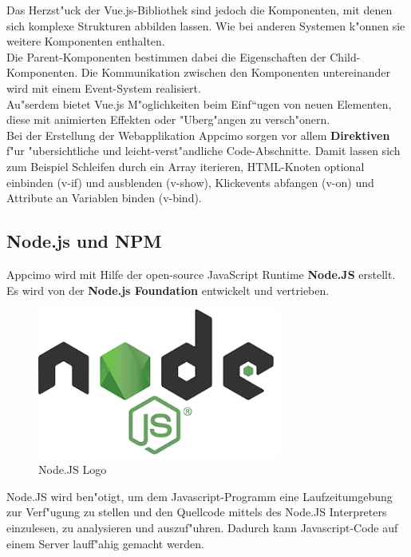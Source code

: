 \documentclass[a4paper, 11pt]{scrreprt}
\begin{document}
Das Herzst"uck der Vue.js-Bibliothek sind jedoch die Komponenten, mit denen sich komplexe Strukturen abbilden lassen. Wie bei anderen Systemen k"onnen sie weitere Komponenten enthalten.\\
Die Parent-Komponenten bestimmen dabei die Eigenschaften der Child-Komponenten. Die Kommunikation zwischen den Komponenten untereinander wird mit einem Event-System realisiert.\\

Au"serdem bietet Vue.js M"oglichkeiten beim Einf“ugen von neuen Elementen, diese mit animierten Effekten oder "Uberg"angen zu versch"onern.\\

Bei der Erstellung der Webapplikation Appcimo sorgen vor allem \textbf{Direktiven} f"ur "ubersichtliche und leicht-verst"andliche Code-Abschnitte. Damit lassen sich zum Beispiel Schleifen durch ein Array iterieren, HTML-Knoten optional einbinden (v-if) und ausblenden (v-show), Klickevents abfangen (v-on) und Attribute an Variablen binden (v-bind).


\subsection{Node.js und NPM}
Appcimo wird mit Hilfe der open-source JavaScript Runtime \textbf{Node.JS} erstellt. Es wird von der \textbf{Node.js Foundation} entwickelt und vertrieben. \\

\begin{figure} [h]
\begin{center}


\includegraphics[width=8cm]{nodejs.png}
\caption{Node.JS Logo}
\label{nodejs}

\end{center}
\end{figure}

Node.JS wird ben"otigt, um dem Javascript-Programm eine Laufzeitumgebung zur Verf"ugung zu stellen und den Quellcode mittels des Node.JS Interpreters einzulesen, zu analysieren und auszuf"uhren. Dadurch kann Javascript-Code auf einem Server lauff"ahig gemacht werden.\\
\end{document}
